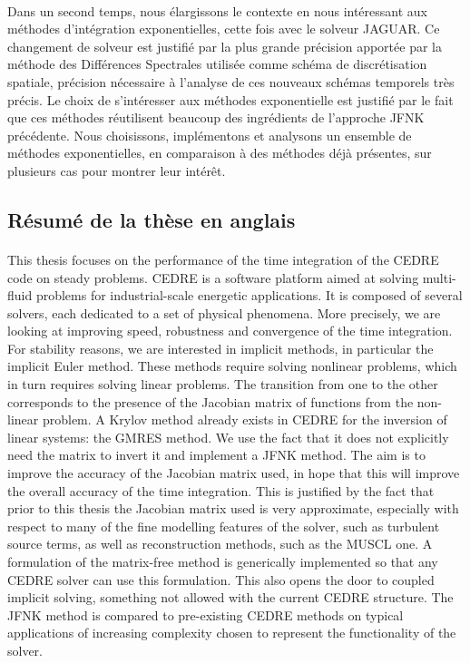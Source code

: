     \paragraph{}
    Dans un second temps, nous élargissons le contexte en nous intéressant aux méthodes d'intégration exponentielles, cette fois avec le solveur JAGUAR.
    Ce changement de solveur est justifié par la plus grande précision apportée par la méthode des Différences Spectrales utilisée comme schéma de discrétisation spatiale, précision nécessaire à l'analyse de ces nouveaux schémas temporels très précis.
    Le choix de s'intéresser aux méthodes exponentielle est justifié par le fait que ces méthodes réutilisent beaucoup des ingrédients de l'approche JFNK précédente.
    Nous choisissons, implémentons et analysons un ensemble de méthodes exponentielles, en comparaison à des méthodes déjà présentes, sur plusieurs cas pour montrer leur intérêt.


  \subsection*{Résumé de la thèse en anglais}


    \paragraph{}
    This thesis focuses on the performance of the time integration of the CEDRE code on steady problems.
    CEDRE is a software platform aimed at solving multi-fluid problems for industrial-scale energetic applications.
    It is composed of several solvers, each dedicated to a set of physical phenomena.
    More precisely, we are looking at improving speed, robustness and convergence of the time integration.
    For stability reasons, we are interested in implicit methods, in particular the implicit Euler method.
    These methods require solving nonlinear problems, which in turn requires solving linear problems.
    The transition from one to the other corresponds to the presence of the Jacobian matrix of functions from the non-linear problem.
    A Krylov method already exists in CEDRE for the inversion of linear systems: the GMRES method.
    We use the fact that it does not explicitly need the matrix to invert it and implement a JFNK method.
    The aim is to improve the accuracy of the Jacobian matrix used, in hope that this will improve the overall accuracy of the time integration.
    This is justified by the fact that prior to this thesis the Jacobian matrix used is very approximate, especially with respect to many of the fine modelling features of the solver, such as turbulent source terms, as well as reconstruction methods, such as the MUSCL one.
    A formulation of the matrix-free method is generically implemented so that any CEDRE solver can use this formulation.
    This also opens the door to coupled implicit solving, something not allowed with the current CEDRE structure.
    The JFNK method is compared to pre-existing CEDRE methods on typical applications of increasing complexity chosen to represent the functionality of the solver.

